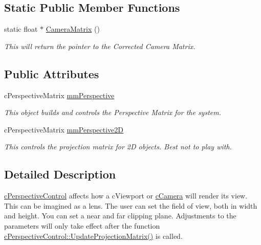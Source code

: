 \subsection*{Static Public Member Functions}
\begin{DoxyCompactItemize}
\item 
\hypertarget{classc_perspective_control_a1a7781d158a255d67d95924345f2230e}{
static float $\ast$ \hyperlink{classc_perspective_control_a1a7781d158a255d67d95924345f2230e}{CameraMatrix} ()}
\label{classc_perspective_control_a1a7781d158a255d67d95924345f2230e}

\begin{DoxyCompactList}\small\item\em This will return the pointer to the Corrected Camera Matrix. \end{DoxyCompactList}\end{DoxyCompactItemize}
\subsection*{Public Attributes}
\begin{DoxyCompactItemize}
\item 
\hypertarget{classc_perspective_control_a6386c5032f9471f652f1444070a09e03}{
cPerspectiveMatrix \hyperlink{classc_perspective_control_a6386c5032f9471f652f1444070a09e03}{mmPerspective}}
\label{classc_perspective_control_a6386c5032f9471f652f1444070a09e03}

\begin{DoxyCompactList}\small\item\em This object builds and controls the Perspective Matrix for the system. \end{DoxyCompactList}\item 
\hypertarget{classc_perspective_control_abdd9b35aa9410e08fe3608b42a7e011c}{
cPerspectiveMatrix \hyperlink{classc_perspective_control_abdd9b35aa9410e08fe3608b42a7e011c}{mmPerspective2D}}
\label{classc_perspective_control_abdd9b35aa9410e08fe3608b42a7e011c}

\begin{DoxyCompactList}\small\item\em This controls the projection matrix for 2D objects. Best not to play with. \end{DoxyCompactList}\end{DoxyCompactItemize}


\subsection{Detailed Description}
\hyperlink{classc_perspective_control}{cPerspectiveControl} affects how a cViewport or \hyperlink{classc_camera}{cCamera} will render its view. This can be imagined as a lens. The user can set the field of view, both in width and height. You can set a near and far clipping plane. Adjustments to the parameters will only take effect after the function \hyperlink{classc_perspective_control_a21f71c817289e0f250dbe9fa83f269bd}{cPerspectiveControl::UpdateProjectionMatrix()} is called. 